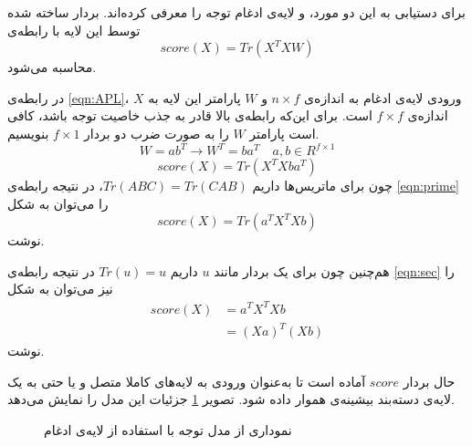برای دستیابی به این دو مورد، \cite{attention_pooling_main} و \cite{attention_pooling} لایه‌ی ادغام توجه را معرفی کرده‌اند. بردار ساخته شده توسط این لایه با رابطه‌ی
\begin{equation}\label{eqn:APL}
	score(X) = Tr(X^{T}XW)
\end{equation}
 محاسبه می‌شود.\cite{attention_pooling_main}

در رابطه‌ی \ref{eqn:APL}، $X$  ورودی لایه‌ی ادغام به اندازه‌ی $n\times f$ و $W$ پارامتر این لایه به اندازه‌ی $f\times f$ است. برای این‌که رابطه‌ی بالا قادر به جذب خاصیت توجه باشد، کافی است پارامتر $W$ را به صورت ضرب دو بردار $f\times 1$ بنویسیم. 
\begin{equation}
	W = ab^T \rightarrow W^T = ba^T \hspace{1em} a, b \in R^{f\times 1}
\end{equation}
\begin{equation}\label{eqn:prime}
		score(X) = Tr(X^{T}Xba^T)
\end{equation}
چون برای ماتریس‌ها داریم $Tr(ABC)=Tr(CAB)$، در نتیجه رابطه‌ی \ref{eqn:prime} را می‌توان به شکل
\begin{equation}\label{eqn:sec}
	score(X) = Tr(a^TX^TXb)
\end{equation}
نوشت.

هم‌چنین چون برای یک بردار مانند $u$ داریم $Tr(u) = u$ در نتیجه رابطه‌ی \ref{eqn:sec} را نیز می‌توان به شکل
\begin{equation}\label{eqn:tri}
\begin{split}
	score(X) & = a^TX^TXb \\ 
	& = (Xa)^T(Xb)
\end{split}
\end{equation}
نوشت.\cite{attention_pooling_main}

حال بردار $score$ آماده است تا به‌عنوان ورودی به لایه‌های کاملا متصل و یا حتی به یک لایه‌ی دسته‌بند بیشینه‌ی هموار داده شود. تصویر \ref{fig:attention_pooling} جزئیات این مدل را نمایش می‌دهد.
\begin{figure}
\label{fig:attention_pooling}
\caption[نموداری از مدل توجه با استفاده از لایه‌ی ادغام]{نموداری از مدل توجه با استفاده از لایه‌ی ادغام \cite{attention_pooling_main}}
\end{figure}










